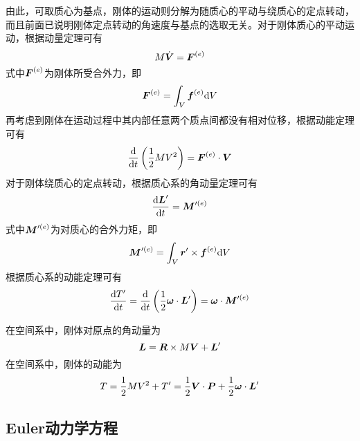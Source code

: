 由此，可取质心为基点，刚体的运动则分解为随质心的平动与绕质心的定点转动，而且前面已说明刚体定点转动的角速度与基点的选取无关。对于刚体质心的平动运动，根据动量定理可有
\begin{equation}
	M \dot{\boldsymbol{V}} = \boldsymbol{F}^{(e)}
\end{equation}
式中$\boldsymbol{F}^{(e)}$为刚体所受合外力，即
\begin{equation*}
	\boldsymbol{F}^{(e)} = \int_V \boldsymbol{f}^{(e)} \mathrm{d} V
\end{equation*}
再考虑到刚体在运动过程中其内部任意两个质点间都没有相对位移，根据动能定理可有
\begin{equation}
	\frac{\mathrm{d}}{\mathrm{d} t}\left(\frac12 MV^2\right) = \boldsymbol{F}^{(e)} \cdot \boldsymbol{V}
\end{equation}
对于刚体绕质心的定点转动，根据质心系的角动量定理可有
\begin{equation}
	\frac{\mathrm{d} \boldsymbol{L}'}{\mathrm{d} t} = \boldsymbol{M}'^{(e)}
\end{equation}
式中$\boldsymbol{M}'^{(e)}$为对质心的合外力矩，即
\begin{equation*}
	\boldsymbol{M}'^{(e)} = \int_V \boldsymbol{r}' \times \boldsymbol{f}^{(e)} \mathrm{d} V
\end{equation*}
根据质心系的动能定理可有
\begin{equation}
	\frac{\mathrm{d} T'}{\mathrm{d} t} = \frac{\mathrm{d}}{\mathrm{d} t} \left(\frac12 \boldsymbol{\omega} \cdot \boldsymbol{L}'\right) = \boldsymbol{\omega} \cdot \boldsymbol{M}'^{(e)}
\end{equation}

在空间系中，刚体对原点的角动量为
\begin{equation}
	\boldsymbol{L} = \boldsymbol{R} \times M \boldsymbol{V} + \boldsymbol{L}'
\end{equation}
在空间系中，刚体的动能为
\begin{equation}
	T = \frac12 MV^2 + T' = \frac12 \boldsymbol{V} \cdot \boldsymbol{P} + \frac12 \boldsymbol{\omega} \cdot \boldsymbol{L}'
\end{equation}

\subsection{Euler动力学方程}


